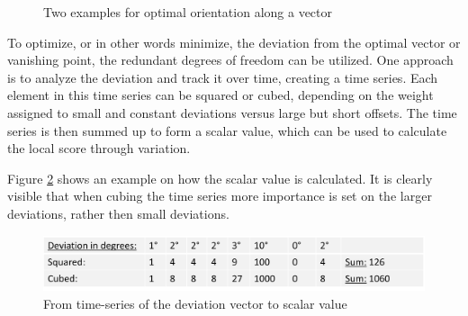 \begin{figure}[H]%
	\centering
	\qquad
	\caption{Two examples for optimal orientation along a vector}%
	\label{OOPti}%
\end{figure}



To optimize, or in other words minimize, the deviation from the optimal vector or vanishing point, the redundant degrees of freedom can be utilized. One approach is to analyze the deviation and track it over time, creating a time series. Each element in this time series can be squared or cubed, depending on the weight assigned to small and constant deviations versus large but short offsets. The time series is then summed up to form a scalar value, which can be used to calculate the local score through variation.


Figure \ref{deviation} shows an example on how the scalar value is calculated. It is clearly visible that when cubing the time series more importance is set on the larger deviations, rather then small deviations.


\begin{figure}[H]
	\centerline{\includegraphics[width=.8\textwidth]{figures/devi.png}}
	\caption{From time-series of the deviation vector to scalar value}
	\label{deviation}
\end{figure}
 

